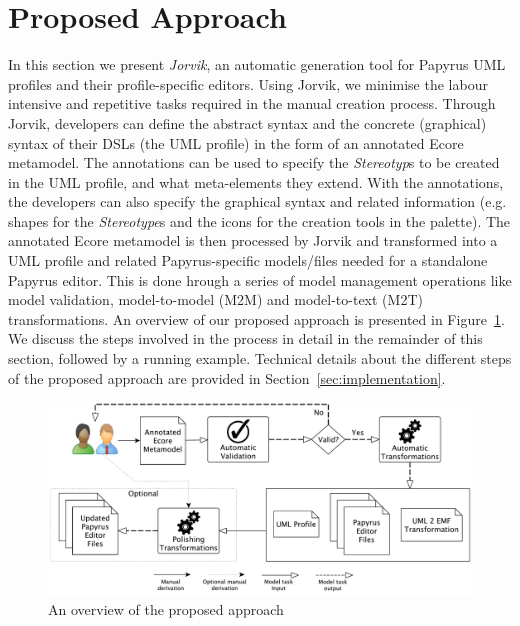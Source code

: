 \section{Proposed Approach}
\label{sec:approach}
In this section we present \textit{Jorvik}, an automatic generation tool for Papyrus UML profiles and their profile-specific editors.
Using Jorvik, we minimise the labour intensive and repetitive tasks required in the manual creation process.
Through Jorvik, developers can define the abstract syntax and the concrete (graphical) syntax of their DSLs (the UML profile) in the form of an annotated Ecore metamodel.
The annotations can be used to specify the \textit{Stereotyp}s to be created in the UML profile, and what meta-elements they extend. 
With the annotations, the developers can also specify the graphical syntax and related information (e.g. shapes for the \textit{Stereotype}s and the icons for the creation tools in the palette). 
The annotated Ecore metamodel is then processed by Jorvik and transformed into a UML profile and related Papyrus-specific models/files needed for a standalone Papyrus editor. This is done hrough a series of model management operations like model validation, model-to-model (M2M) and model-to-text (M2T) transformations. An overview of our proposed approach is presented in Figure~\ref{fig:approachOverview}. 
We discuss the steps involved in the process in detail in the remainder of this section, followed by a running example. 
Technical details about the different steps of the proposed approach are provided in Section~\ref{sec:implementation}.

\begin{figure}[ht!]
	\centering
	\includegraphics[width=1\textwidth]{diagrams/approachOverview.pdf}
	\caption[]{An overview of the proposed approach}
	\label{fig:approachOverview}
\end{figure}

